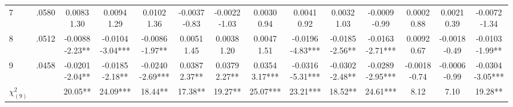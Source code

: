 \begin{landscape}
\begin{center}
{\begin{adjustbox}{max width=\textheight}
\begin{tabular}{lccccccccccccc}
7 & .0580 & \shortstack{0.0083\\1.30} & \shortstack{0.0094\\1.29} & \shortstack{0.0102\\1.36} & \shortstack{-0.0037\\-0.83} & \shortstack{-0.0022\\-1.03} & \shortstack{0.0030\\0.94} & \shortstack{0.0041\\0.92} & \shortstack{0.0032\\1.03} & \shortstack{-0.0009\\-0.99} & \shortstack{0.0002\\0.88} & \shortstack{0.0021\\0.39} & \shortstack{-0.0072\\-1.34} \\
8 & .0512 & \shortstack{-0.0088\\-2.23**} & \shortstack{-0.0104\\-3.04***} & \shortstack{-0.0086\\-1.97**} & \shortstack{0.0051\\1.45} & \shortstack{0.0038\\1.20} & \shortstack{0.0047\\1.51} & \shortstack{-0.0196\\-4.83***} & \shortstack{-0.0185\\-2.56**} & \shortstack{-0.0163\\-2.71***} & \shortstack{0.0092\\0.67} & \shortstack{-0.0018\\-0.49} & \shortstack{-0.0103\\-1.99**} \\
9 & .0458 & \shortstack{-0.0201\\-2.04**} & \shortstack{-0.0185\\-2.18**} & \shortstack{-0.0240\\-2.69***} & \shortstack{0.0387\\2.37**} & \shortstack{0.0379\\2.27**} & \shortstack{0.0354\\3.17***} & \shortstack{-0.0316\\-5.31***} & \shortstack{-0.0302\\-2.48**} & \shortstack{-0.0289\\-2.95***} & \shortstack{-0.0018\\-0.74} & \shortstack{-0.0006\\-0.99} & \shortstack{-0.0304\\-3.05***} \\
$\chi^2_{(9)}$ &  & 20.05** & 24.09*** & 18.44** & 17.38** & 19.27** & 25.07*** & 23.21*** & 18.52** & 24.61*** & 8.12 & 7.10 & 19.28** \\
\bottomrule
\end{tabular}
\end{adjustbox}}
\end{center}
\end{landscape}


